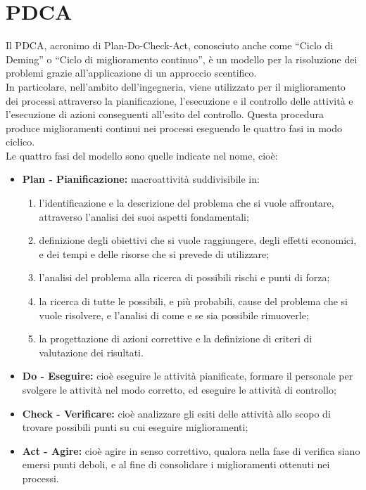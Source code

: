 
\section{PDCA} \label{app:pdca}
Il PDCA, acronimo di Plan-Do-Check-Act, conosciuto anche come ``Ciclo di Deming'' o ``Ciclo di miglioramento continuo'', è un modello per la risoluzione dei problemi grazie all'applicazione di un approccio scentifico.\\
In particolare, nell'ambito dell'ingegneria, viene utilizzato per il miglioramento dei processi attraverso la pianificazione, l'esecuzione e il controllo delle attività e l'esecuzione di azioni conseguenti all'esito del controllo. Questa procedura produce miglioramenti continui nei processi eseguendo le quattro fasi in modo ciclico.\\
Le quattro fasi del modello sono quelle indicate nel nome, cioè:
\begin{itemize}
	\item \textbf{Plan - Pianificazione:} macroattività suddivisibile in:
		\begin{enumerate}
		\item l'identificazione e la descrizione del problema che si vuole affrontare, attraverso l'analisi dei suoi aspetti fondamentali;
		\item definizione degli obiettivi che si vuole raggiungere, degli effetti economici, e dei tempi e delle risorse che si prevede di utilizzare;
		\item l'analisi del problema alla ricerca di possibili rischi e punti di forza;
		\item la ricerca di tutte le possibili, e più probabili, cause del problema che si vuole risolvere, e l'analisi di come e se sia possibile rimuoverle;
		\item la progettazione di azioni correttive e la definizione di criteri di valutazione dei risultati.
		\end{enumerate}
	\item \textbf{Do - Eseguire:} cioè eseguire le attività pianificate, formare il personale per svolgere le attività nel modo corretto, ed eseguire le attività di controllo;
	\item \textbf{Check - Verificare:} cioè analizzare gli esiti delle attività allo scopo di trovare possibili punti su cui eseguire miglioramenti;
	\item \textbf{Act - Agire:} cioè agire in senso correttivo, qualora nella fase di verifica siano emersi punti deboli, e al fine di consolidare i miglioramenti ottenuti nei processi.
\end{itemize}

